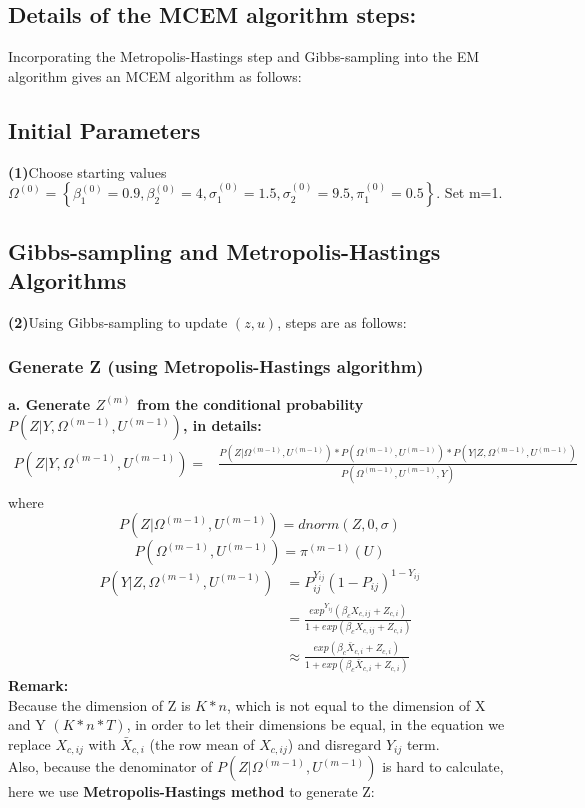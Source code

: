 \documentclass[10pt]{article}
\begin{document}
\begin{CJK}{UTF8}{gbsn}
\section{Details of the MCEM algorithm steps:}
Incorporating the Metropolis-Hastings step and Gibbs-sampling into the EM algorithm gives an MCEM algorithm as follows:
\bigskip
\subsection{Initial Parameters}
\textbf{(1)}Choose starting values $\Omega^{(0)}=\left\lbrace \beta_1^{(0)}=0.9,\beta_2^{(0)}=4,\sigma_1^{(0)}=1.5,\sigma_2^{(0)}=9.5,\pi_1^{(0)}=0.5\right\rbrace $. Set m=1.
\subsection{Gibbs-sampling and Metropolis-Hastings Algorithms}
\textbf{(2)}Using Gibbs-sampling to update $(z,u)$, steps are as follows:
\medskip
\subsubsection{Generate Z (using Metropolis-Hastings algorithm)}
\hspace*{1cm}\textbf{a. Generate $Z^{(m)}$ from the conditional probability $P(Z|Y,\Omega^{(m-1)},U^{(m-1)})$, in details:}
\[
\begin{split}
P(Z|Y,\Omega^{(m-1)},U^{(m-1)})=&\frac{P(Z|\Omega^{(m-1)},U^{(m-1)})*P(\Omega^{(m-1)},U^{(m-1)})*P(Y|Z,\Omega^{(m-1)},U^{(m-1)})}{P(\Omega^{(m-1)},U^{(m-1)},Y)}\\&
\end{split}\]
\medskip
\indent where \begin{equation}
P(Z|\Omega^{(m-1)},U^{(m-1)})=dnorm(Z,0,\sigma)
\end{equation}
\begin{equation}
P(\Omega^{(m-1)},U^{(m-1)})=\pi^{(m-1)}(U)
\end{equation}
\begin{equation}
\begin{split}
P(Y|Z,\Omega^{(m-1)},U^{(m-1)})&=P_{ij}^{Y_{ij}}(1-P_{ij})^{1-Y_{ij}}\\&=\frac{exp^{Y_{ij}}(\beta_cX_{c,ij}+Z_{c,i})}{1+exp(\beta_cX_{c,ij}+Z_{c,i})}\\
&\approx \frac{exp(\beta_c\bar{X}_{c,i}+Z_{c,i})}{1+exp(\beta_c\bar{X}_{c,i}+Z_{c,i})}
\end{split}
\end{equation}
\textbf{Remark:} 
\\Because the dimension of Z is $K*n$, which is not equal to the dimension of X and Y $(K*n*T)$, in order to let their dimensions be equal, in the equation we replace $X_{c,ij}$ with $\bar{X}_{c,i}$ (the row mean of $X_{c,ij}$) and disregard $Y_{ij}$ term.  
\bigskip
\\Also, because the denominator of $P(Z|\Omega^{(m-1)},U^{(m-1)})$ is hard to calculate, here we use \textbf{Metropolis-Hastings method} to generate Z:


\end{CJK}
\end{document}
